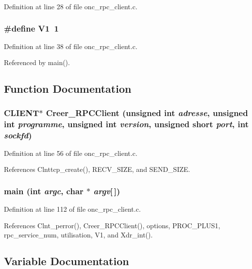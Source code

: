 Definition at line 28 of file onc\_\-rpc\_\-client.c.
\subsubsection{\setlength{\rightskip}{0pt plus 5cm}\#define V1\ 1}\label{onc__rpc__client_8c_a5}




Definition at line 38 of file onc\_\-rpc\_\-client.c.

Referenced by main().

\subsection{Function Documentation}
\subsubsection{\setlength{\rightskip}{0pt plus 5cm}CLIENT$\ast$ Creer\_\-RPCClient (unsigned int {\em adresse}, unsigned int {\em programme}, unsigned int {\em version}, unsigned short {\em port}, int {\em sockfd})}\label{onc__rpc__client_8c_a11}




Definition at line 56 of file onc\_\-rpc\_\-client.c.

References Clnttcp\_\-create(), RECV\_\-SIZE, and SEND\_\-SIZE.
\subsubsection{\setlength{\rightskip}{0pt plus 5cm}main (int {\em argc}, char $\ast$ {\em argv}[$\,$])}\label{onc__rpc__client_8c_a12}




Definition at line 112 of file onc\_\-rpc\_\-client.c.

References Clnt\_\-perror(), Creer\_\-RPCClient(), options, PROC\_\-PLUS1, rpc\_\-service\_\-num, utilisation, V1, and Xdr\_\-int().

\subsection{Variable Documentation}
